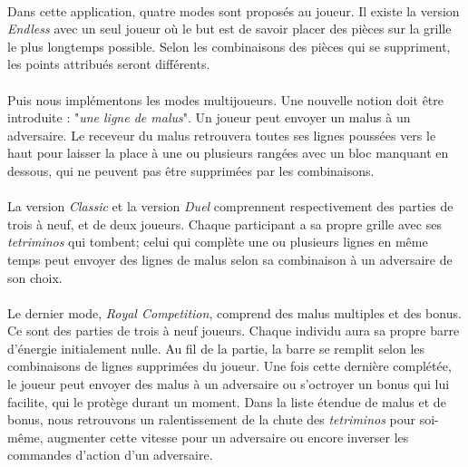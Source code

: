 \documentclass{article}
\begin{document}
\paragraph*{}

Dans cette application, quatre modes sont proposés au joueur. Il existe la version \textit{Endless} avec un seul joueur où le but est de savoir placer des pièces sur la grille le plus longtemps possible. Selon les combinaisons des pièces qui se suppriment, les points attribués seront différents.
 
\paragraph*{}

Puis nous implémentons les modes multijoueurs. Une nouvelle notion doit être introduite : "\textit{une ligne de malus}". Un joueur peut envoyer un malus à un adversaire. Le receveur du malus retrouvera toutes ses lignes poussées vers le haut pour laisser la place à une ou plusieurs rangées avec un bloc manquant en dessous, qui ne peuvent pas être supprimées par les combinaisons.  

\paragraph*{}

La version \textit{Classic} et la version \textit{Duel} comprennent respectivement des parties de trois à neuf, et de deux joueurs. Chaque participant a sa propre grille avec ses \textit{tetriminos} qui tombent; celui qui complète une ou plusieurs lignes en même temps peut envoyer des lignes de malus selon sa combinaison à un adversaire de son choix. 

\paragraph*{}

Le dernier mode, \textit{ Royal Competition}, comprend des malus multiples et des bonus. Ce sont des parties de trois à neuf joueurs. Chaque individu aura sa propre barre d'énergie initialement nulle. Au fil de la partie, la barre se remplit selon les combinaisons de lignes supprimées du joueur. Une fois cette dernière complétée, le joueur peut envoyer des malus à un adversaire ou s'octroyer un bonus qui lui facilite, qui le protège durant un moment. Dans la liste étendue de malus et de bonus, nous retrouvons un ralentissement de la chute des \textit{tetriminos} pour soi-même, augmenter cette vitesse pour un adversaire ou encore inverser les commandes d'action d'un adversaire.
\end{document}
